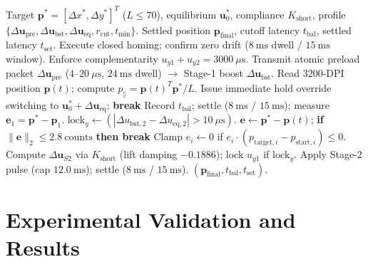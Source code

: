 \documentclass[journal]{IEEEtran}
\begin{document}
\begin{algorithm}[!t]
\caption{In-Flight Optical-Feedback Optimal-Time Ballistic Control (IF-OPB)}
\label{alg:ifopb}
\begin{algorithmic}[1]
\Require Target $\mathbf{p}^* = [\Delta x^*, \Delta y^*]^T$ ($L \le 70$), equilibrium $\mathbf{u}_0^*$, compliance $K_{\text{short}}$, profile $\{\Delta\mathbf{u}_{\text{pre}}, \Delta\mathbf{u}_{\text{bst}}, \Delta\mathbf{u}_{\text{eq}}, r_{\text{cut}}, t_{\min}\}$.
\Ensure Settled position $\mathbf{p}_{\text{final}}$, cutoff latency $t_{\text{bal}}$, settled latency $t_{\text{set}}$.
\State Execute closed homing; confirm zero drift ($8\ \text{ms}$ dwell / $15\ \text{ms}$ window).
\State Enforce complementarity $u_{y1} + u_{y2} = 3000\ \mu\text{s}$.
\State Transmit atomic preload packet $\Delta\mathbf{u}_{\text{pre}}$ ($4\text{--}20\ \mu\text{s}$, $24\ \text{ms}$ dwell) $\to$ Stage-1 boost $\Delta\mathbf{u}_{\text{bst}}$.
    \State Read 3200-DPI position $\mathbf{p}(t)$; compute $p_\parallel = \mathbf{p}(t)^T \mathbf{p}^* / L$.
        \State Issue immediate hold override switching to $\mathbf{u}_0^* + \Delta\mathbf{u}_{\text{eq}}$; \textbf{break}
    \EndIf
\EndWhile
\State Record $t_{\text{bal}}$; settle ($8\ \text{ms}$ / $15\ \text{ms}$); measure $\mathbf{e}_1 = \mathbf{p}^* - \mathbf{p}_1$.
\State $\text{lock}_y \gets (|\Delta u_{\text{bst},2} - \Delta u_{\text{eq},2}| > 10\ \mu\text{s})$.
    \State $\mathbf{e} \gets \mathbf{p}^* - \mathbf{p}(t)$; \textbf{if} $\|\mathbf{e}\|_2 \le 2.8\ \text{counts}$ \textbf{then break}
    \State Clamp $e_i \gets 0$ if $e_i \cdot (p_{\text{target},i} - p_{\text{start},i}) \le 0$.
    \State Compute $\Delta\mathbf{u}_{S2}$ via $K_{\text{short}}$ (lift damping $-0.1886$); lock $u_{y1}$ if $\text{lock}_y$.
        \State Apply Stage-2 pulse (cap $12.0\ \text{ms}$); settle ($8\ \text{ms}$ / $15\ \text{ms}$).
    \EndIf
\EndFor
\State \Return $(\mathbf{p}_{\text{final}}, t_{\text{bal}}, t_{\text{set}})$.
\end{algorithmic}
\end{algorithm}

\section{Experimental Validation and Results}
\end{document}
